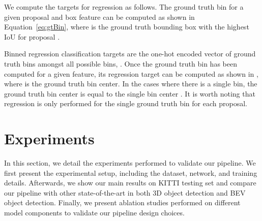 \documentclass[10pt,twocolumn,letterpaper]{article}
\begin{document}
We compute the targets for regression as follows.
The ground truth bin for a given proposal  and box feature  can be computed as shown in Equation~\eqref{eq:gtBin}, where  is the ground truth bounding box with the highest IoU for proposal .




Binned regression classification targets are the one-hot encoded vector of ground truth bins  amongst all  possible bins, \ie .
Once the ground truth bin has been computed for a given feature, its regression target can be computed as shown in , where  is the ground truth bin center.
In the cases where there is a single bin, the ground truth bin center is equal to the single bin center \ie .
It is worth noting that regression is only performed for the single ground truth bin for each proposal.






    



 \section{Experiments}
\label{sec:Experiments}
In this section, we detail the experiments performed to validate our pipeline.
We first present the experimental setup, including the dataset, network, and training details.
Afterwards, we show our main results on KITTI testing set and compare our pipeline with other state-of-the-art in both 3D object detection and BEV object detection.
Finally, we present ablation studies performed on different model components to validate our pipeline design choices.
\end{document}
